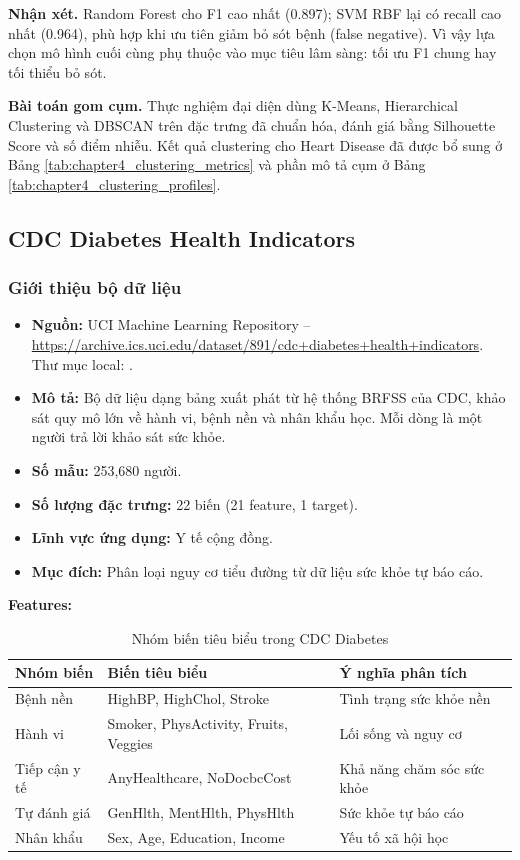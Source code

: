 \textbf{Nhận xét.} Random Forest cho F1 cao nhất (0.897); SVM RBF lại có recall cao nhất (0.964), phù hợp khi ưu tiên giảm bỏ sót bệnh (false negative). Vì vậy lựa chọn mô hình cuối cùng phụ thuộc vào mục tiêu lâm sàng: tối ưu F1 chung hay tối thiểu bỏ sót.

\textbf{Bài toán gom cụm.} Thực nghiệm đại diện dùng K-Means, Hierarchical Clustering và DBSCAN trên đặc trưng đã chuẩn hóa, đánh giá bằng Silhouette Score và số điểm nhiễu. Kết quả clustering cho Heart Disease đã được bổ sung ở Bảng \ref{tab:chapter4_clustering_metrics} và phần mô tả cụm ở Bảng \ref{tab:chapter4_clustering_profiles}.

\subsection{CDC Diabetes Health Indicators}

\subsubsection{Giới thiệu bộ dữ liệu}

\begin{itemize}
 \item \textbf{Nguồn:} UCI Machine Learning Repository -- \url{https://archive.ics.uci.edu/dataset/891/cdc+diabetes+health+indicators}. Thư mục local: .
 \item \textbf{Mô tả:} Bộ dữ liệu dạng bảng xuất phát từ hệ thống BRFSS của CDC, khảo sát quy mô lớn về hành vi, bệnh nền và nhân khẩu học. Mỗi dòng là một người trả lời khảo sát sức khỏe.
 \item \textbf{Số mẫu:} 253,680 người.
 \item \textbf{Số lượng đặc trưng:} 22 biến (21 feature, 1 target).
 \item \textbf{Lĩnh vực ứng dụng:} Y tế cộng đồng.
 \item \textbf{Mục đích:} Phân loại nguy cơ tiểu đường từ dữ liệu sức khỏe tự báo cáo.
\end{itemize}

\textbf{Features:}

\begin{table}[H]
\centering
\caption{Nhóm biến tiêu biểu trong CDC Diabetes}
\label{tab:cdc_feature_groups}
\small
\begin{tabular}{lll}
\toprule
Nhóm biến & Biến tiêu biểu & Ý nghĩa phân tích \\
\midrule
Bệnh nền & HighBP, HighChol, Stroke & Tình trạng sức khỏe nền \\
Hành vi & Smoker, PhysActivity, Fruits, Veggies & Lối sống và nguy cơ \\
Tiếp cận y tế & AnyHealthcare, NoDocbcCost & Khả năng chăm sóc sức khỏe \\
Tự đánh giá & GenHlth, MentHlth, PhysHlth & Sức khỏe tự báo cáo \\
Nhân khẩu & Sex, Age, Education, Income & Yếu tố xã hội học \\
\bottomrule
\end{tabular}
\end{table}

